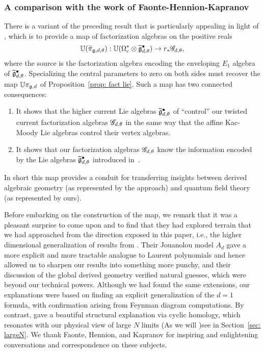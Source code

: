\subsubsection{A comparison with the work of Faonte-Hennion-Kapranov}

There is a variant of the preceding result that is particularly appealing in light of \cite{FHK},
which is to provide a map of factorization algebras on the positive reals
\[
\mathbb U(\widetilde{\pi}_{\mathfrak g,d,\theta}): \mathbb U(\Omega^*_c \otimes \widetilde{\mathfrak g}^\bullet_{d,\theta}) \to r_* \mathscr G_{d,\theta},
\] 
where the source is the factorization algebra encoding the enveloping $E_1$ algebra of $\widetilde{\mathfrak g}^\bullet_{d,\theta}$.
Specializing the central parameters to zero on both sides must recover the map $\mathbb U\pi_{\mathfrak g, d}$ of Proposition~\ref{prop: fact lie}.
Such a map has two connected consequences:
\begin{enumerate}
\item It shows that the higher current Lie algebras $\widetilde{\mathfrak g}^\bullet_{d,\theta}$ of \cite{FHK} ``control'' our twisted current factorization algebras $\mathscr G_{d,\theta}$ in the same way that the affine Kac-Moody Lie algebras control their vertex algebras.
\item It shows that our factorization algebras $\mathscr G_{d,\theta}$ know the information encoded by the Lie algebras $\widetilde{\mathfrak g}^\bullet_{d,\theta}$ introduced in~\cite{FHK}.
\end{enumerate}
In short this map provides a conduit for transferring insights between derived algebraic geometry (as represented by the \cite{FHK} approach) and quantum field theory (as represented by ours).

\begin{rmk}
Before embarking on the construction of the map,
we remark that it was a pleasant surprise to come upon \cite{FHK} 
and to find that they had explored terrain that we had approached from the direction exposed in this paper,
i.e., the higher dimensional generalization of results from \cite{CG1}.
Their Jouanolou model $A_d$ gave a more explicit and more tractable analogue to Laurent polynomials and hence allowed us to sharpen our results into something more punchy,
and their discussion of the global derived geometry verified natural guesses, 
which were beyond our technical powers.
Although we had found the same extensions, 
our explanations were based on finding an explicit generalization of the $d=1$ formula,
with confirmation arising from Feynman diagram computations.
By contrast,  \cite{FHK} gave a beautiful structural explanation via cyclic homology,
which resonates with our physical view of large $N$ limits
(As we will )see in Section~\ref{sec: largeN}.
We thank Faonte, Hennion, and Kapranov for inspiring and enlightening conversations and correspondence on these subjects.
\end{rmk}

